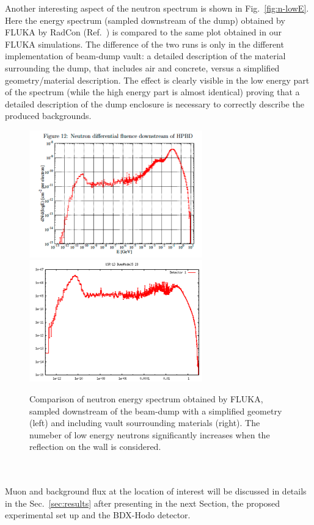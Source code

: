 Another interesting aspect of the neutron spectrum is shown in Fig.~\ref{fig:n-lowE}. Here the energy spectrum (sampled downstream of the dump) obtained by FLUKA by RadCon (Ref.~\cite{jnote-bd}) is compared to the same plot obtained in our FLUKA simulations. The difference of the two runs is only in the different implementation of  beam-dump vault: a detailed description of the material surrounding the dump,  that includes air and concrete,  versus a simplified geometry/material description.   The effect is clearly visible in the low energy part of the spectrum (while the high energy part is almost identical) proving that a detailed description of the dump enclosure is necessary to correctly describe the produced backgrounds.
\begin{figure}[h!] 
\center
\includegraphics[width=7.5cm]{figs/bg-lowN-george.pdf}    
\includegraphics[width=7.5cm]{figs/NeutronsDumpComparisonDnDlogE_1D.pdf}   
\caption{Comparison of neutron energy spectrum obtained by FLUKA, sampled downstream of the beam-dump with a simplified geometry (left) and including vault sourrounding materials (right). The numeber of low energy neutrons significantly increases when the reflection on the wall is considered.}
\label{fig:bg-lowE}
\end{figure}
\\ \\ 
Muon and background flux  at  the location of interest will be discussed in details in the Sec.~\ref{sec:results} after presenting in the next Section,  the proposed experimental set up and the BDX-Hodo detector. 



